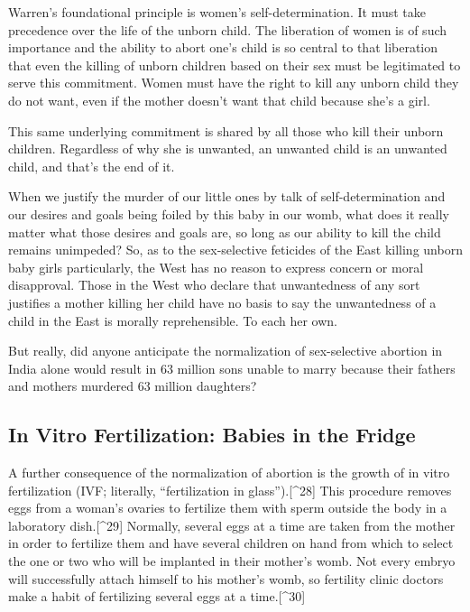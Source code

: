 \documentclass[
]{book}
\begin{document}
Warren's foundational principle is women's self-determination. It must take precedence over the life of the unborn child. The liberation of women is of such importance and the ability to abort one's child is so central to that liberation that even the killing of unborn children based on their sex must be legitimated to serve this commitment. Women must have the right to kill any unborn child they do not want, even if the mother doesn't want that child because she's a girl.

This same underlying commitment is shared by all those who kill their unborn children. Regardless of why she is unwanted, an unwanted child is an unwanted child, and that's the end of it.

When we justify the murder of our little ones by talk of self-determination and our desires and goals being foiled by this baby in our womb, what does it really matter what those desires and goals are, so long as our ability to kill the child remains unimpeded? So, as to the sex-selective feticides of the East killing unborn baby girls particularly, the West has no reason to express concern or moral disapproval. Those in the West who declare that unwantedness of any sort justifies a mother killing her child have no basis to say the unwantedness of a child in the East is morally reprehensible. To each her own.

But really, did anyone anticipate the normalization of sex-selective abortion in India alone would result in 63 million sons unable to marry because their fathers and mothers murdered 63 million daughters?

\hypertarget{in-vitro-fertilization-babies-in-the-fridge}{%
\subsection{In Vitro Fertilization: Babies in the Fridge}\label{in-vitro-fertilization-babies-in-the-fridge}}

A further consequence of the normalization of abortion is the growth of in vitro fertilization (IVF; literally, ``fertilization in glass'').{[}\^{}28{]} This procedure removes eggs from a woman's ovaries to fertilize them with sperm outside the body in a laboratory dish.{[}\^{}29{]} Normally, several eggs at a time are taken from the mother in order to fertilize them and have several children on hand from which to select the one or two who will be implanted in their mother's womb. Not every embryo will successfully attach himself to his mother's womb, so fertility clinic doctors make a habit of fertilizing several eggs at a time.{[}\^{}30{]}
\end{document}
